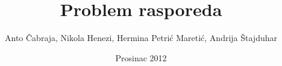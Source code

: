 \title{Problem rasporeda}
\author{Anto Čabraja, Nikola Henezi, Hermina Petrić Maretić, Andrija Štajduhar}
\date{Prosinac 2012}
\maketitle